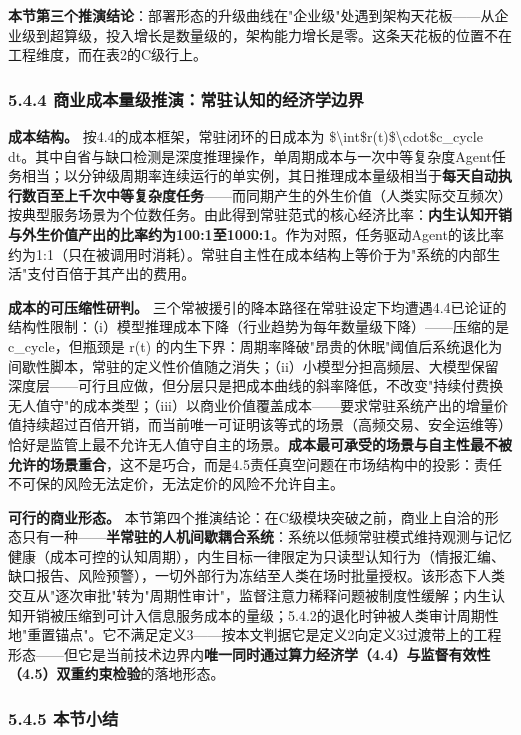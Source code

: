 \documentclass[11pt,a4paper]{ctexart}
\begin{document}
\textbf{本节第三个推演结论}：部署形态的升级曲线在"企业级"处遇到架构天花板——从企业级到超算级，投入增长是数量级的，架构能力增长是零。这条天花板的位置不在工程维度，而在表2的C级行上。

\subsubsection{5.4.4 商业成本量级推演：常驻认知的经济学边界}

\textbf{成本结构。} 按4.4的成本框架，常驻闭环的日成本为 \$\textbackslash{}int\$r(t)\$\textbackslash{}cdot\$c\_cycle dt。其中自省与缺口检测是深度推理操作，单周期成本与一次中等复杂度Agent任务相当；以分钟级周期率连续运行的单实例，其日推理成本量级相当于\textbf{每天自动执行数百至上千次中等复杂度任务}——而同期产生的外生价值（人类实际交互频次）按典型服务场景为个位数任务。由此得到常驻范式的核心经济比率：\textbf{内生认知开销与外生价值产出的比率约为100:1至1000:1}。作为对照，任务驱动Agent的该比率约为1:1（只在被调用时消耗）。常驻自主性在成本结构上等价于为"系统的内部生活"支付百倍于其产出的费用。

\textbf{成本的可压缩性研判。} 三个常被援引的降本路径在常驻设定下均遭遇4.4已论证的结构性限制：（i）模型推理成本下降（行业趋势为每年数量级下降）——压缩的是 c\_cycle，但瓶颈是 r(t) 的内生下界：周期率降破"昂贵的休眠"阈值后系统退化为间歇性脚本，常驻的定义性价值随之消失；（ii）小模型分担高频层、大模型保留深度层——可行且应做，但分层只是把成本曲线的斜率降低，不改变"持续付费换无人值守"的成本类型；（iii）以商业价值覆盖成本——要求常驻系统产出的增量价值持续超过百倍开销，而当前唯一可证明该等式的场景（高频交易、安全运维等）恰好是监管上最不允许无人值守自主的场景。\textbf{成本最可承受的场景与自主性最不被允许的场景重合}，这不是巧合，而是4.5责任真空问题在市场结构中的投影：责任不可保的风险无法定价，无法定价的风险不允许自主。

\textbf{可行的商业形态。} 本节第四个推演结论：在C级模块突破之前，商业上自洽的形态只有一种——\textbf{半常驻的人机间歇耦合系统}：系统以低频常驻模式维持观测与记忆健康（成本可控的认知周期），内生目标一律限定为只读型认知行为（情报汇编、缺口报告、风险预警），一切外部行为冻结至人类在场时批量授权。该形态下人类交互从"逐次审批"转为"周期性审计"，监督注意力稀释问题被制度性缓解；内生认知开销被压缩到可计入信息服务成本的量级；5.4.2的退化时钟被人类审计周期性地"重置锚点"。它不满足定义3——按本文判据它是定义2向定义3过渡带上的工程形态——但它是当前技术边界内\textbf{唯一同时通过算力经济学（4.4）与监督有效性（4.5）双重约束检验}的落地形态。

\subsubsection{5.4.5 本节小结}
\end{document}

